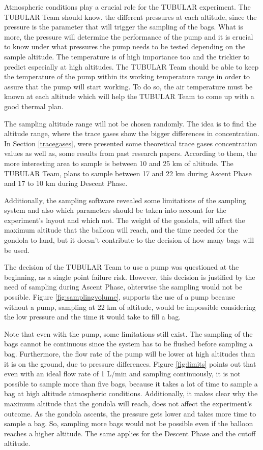 \documentclass[a4paper,12pt,oneside]{article}
\begin{document}
\begin{appendices}
Atmospheric conditions play a crucial role for the TUBULAR experiment. The TUBULAR Team should know, the different pressures at each altitude, since the pressure is the parameter that will trigger the sampling of the bags. What is more, the pressure will determine the performance of the pump and it is crucial to know under what pressures the pump needs to be tested depending on the sample altitude. The temperature is of high importance too and the trickier to predict especially at high altitudes. The TUBULAR Team should be able to keep the temperature of the pump within its working temperature range in order to assure that the pump will start working. To do so, the air temperature must be known at each altitude which will help the TUBULAR Team to come up with a good thermal plan. 

The sampling altitude range will not be chosen randomly. The idea is to find the altitude range, where the trace gases show the bigger differences in concentration. In Section \ref{tracegases}, were presented some theoretical trace gases concentration values as well as, some results from past research papers. According to them, the more interesting area to sample is between 10 and 25 km of altitude. The TUBULAR Team, plans to sample between 17 and 22 km during Ascent Phase and 17 to 10 km during Descent Phase. 

Additionally, the sampling software revealed some limitations of the sampling system and also which parameters should be taken into account for the experiment's layout and which not. 
The weight of the gondola, will affect the maximum altitude that the balloon will reach, and the time needed for the gondola to land, but it doesn't contribute to the decision of how many bags will be used.

The decision of the TUBULAR Team to use a pump was questioned at the beginning, as a single point failure risk. However, this decision is justified by the need of sampling during Ascent Phase, ohterwise the sampling would not be possible.  Figure \ref{fig:samplingvolume}, supports the use of a pump because without a pump, sampling at 22 km of altitude, would be impossible considering the low pressure and the time it would take to fill a bag. 

Note that even with the pump, some limitations still exist. The sampling of the bags cannot be continuous since the system has to be flushed before sampling a bag. Furthermore, the flow rate of the pump will be lower at high altitudes than it is on the ground, due to pressure differences. Figure \ref{fig:limits} points out that even with an ideal flow rate of 1 L/min and sampling continuously, it is not possible to sample more than five bags, because it takes a lot of time to sample a bag at high altitude atmospheric conditions. Additionally, it makes clear why the maximum altitude that the gondola will reach, does not affect the experiment's outcome. As the gondola ascents, the pressure gets lower and takes more time to sample a bag. So, sampling more bags would not be possible even if the balloon reaches a higher altitude. The same applies for the Descent Phase and the cutoff altitude. 


\end{appendices}
\end{document}
